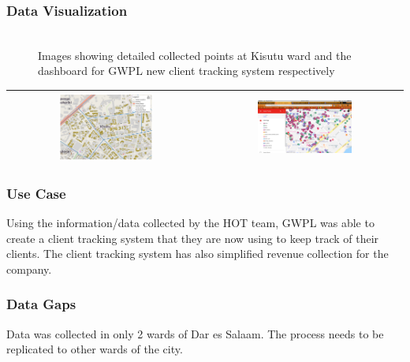 \documentclass[a4paper,12pt,twoside]{article}
\begin{document}
\subsubsection{Data Visualization}
\begin{figure}[h]
	\caption{Images showing detailed collected points at Kisutu ward and the dashboard for GWPL new client tracking system respectively}
	\centering
	\includegraphics[width=0\textwidth]{images/Building_Footprint_Digitization.png}
\end{figure}
\begin{tabular}{|c@{}c|}
	\hline
	
	\includegraphics[width=0.5\textwidth]{images/GWPL_client_map.png}&%
	\includegraphics[width=0.5\textwidth]{images/GWPL_client_tracking_system.png}\\
	\hline
\end{tabular}

\subsubsection{Use Case}
Using the information/data collected by the HOT team, GWPL was able to create a client tracking system that they are now using to keep track of their clients. The client tracking system has also simplified revenue collection for the company.

\subsubsection{Data Gaps}
Data was collected in only 2 wards of Dar es Salaam. The process needs to be replicated to other wards of the city.
\end{document}
